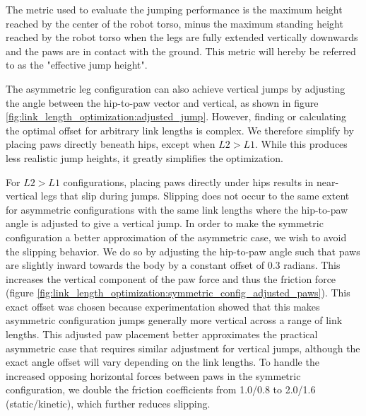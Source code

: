 The metric used to evaluate the jumping performance is the maximum height reached by the center of the robot torso, minus the maximum standing height reached by the robot torso when the legs are fully extended vertically downwards and the paws are in contact with the ground. This metric will hereby be referred to as the "effective jump height".

The asymmetric leg configuration can also achieve vertical jumps by adjusting the angle between the hip-to-paw vector and vertical, as shown in figure \ref{fig:link_length_optimization:adjusted_jump}. However, finding or calculating the optimal offset for arbitrary link lengths is complex. We therefore simplify by placing paws directly beneath hips, except when $L2>L1$. While this produces less realistic jump heights, it greatly simplifies the optimization.

For $L2>L1$ configurations, placing paws directly under hips results in near-vertical legs that slip during jumps. Slipping does not occur to the same extent for asymmetric configurations with the same link lengths where the hip-to-paw angle is adjusted to give a vertical jump. In order to make the symmetric configuration a better approximation of the asymmetric case, we wish to avoid the slipping behavior. We do so by adjusting the hip-to-paw angle such that paws are slightly inward towards the body by a constant offset of 0.3 radians. This increases the vertical component of the paw force and thus the friction force (figure \ref{fig:link_length_optimization:symmetric_config_adjusted_paws}). This exact offset was chosen because experimentation showed that this makes asymmetric configuration jumps generally more vertical across a range of link lengths. This adjusted paw placement better approximates the practical asymmetric case that requires similar adjustment for vertical jumps, although the exact angle offset will vary depending on the link lengths. To handle the increased opposing horizontal forces between paws in the symmetric configuration, we double the friction coefficients from 1.0/0.8 to 2.0/1.6 (static/kinetic), which further reduces slipping.

